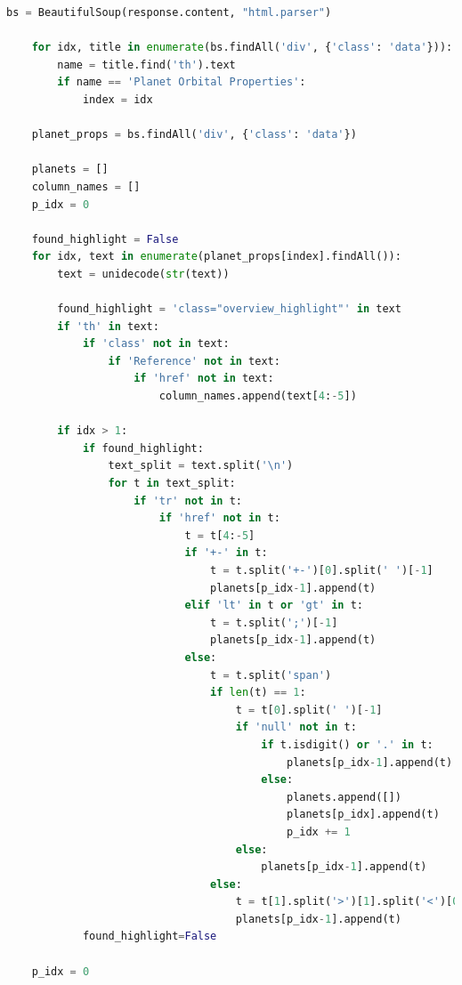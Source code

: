 \documentclass[11pt, oneside]{article}   	%
\begin{document}
\begin{lstlisting}[language=Python, caption={Extracting data from \href{https://exoplanetarchive.ipac.caltech.edu/}{Nasa Exoplanet Archive}}]
    bs = BeautifulSoup(response.content, "html.parser")

    for idx, title in enumerate(bs.findAll('div', {'class': 'data'})):
        name = title.find('th').text
        if name == 'Planet Orbital Properties':
            index = idx

    planet_props = bs.findAll('div', {'class': 'data'})

    planets = []
    column_names = []
    p_idx = 0

    found_highlight = False
    for idx, text in enumerate(planet_props[index].findAll()):
        text = unidecode(str(text))

        found_highlight = 'class="overview_highlight"' in text
        if 'th' in text:
            if 'class' not in text:
                if 'Reference' not in text:
                    if 'href' not in text:
                        column_names.append(text[4:-5])
                        
        if idx > 1:
            if found_highlight:
                text_split = text.split('\n')
                for t in text_split:
                    if 'tr' not in t:
                        if 'href' not in t:
                            t = t[4:-5]
                            if '+-' in t:
                                t = t.split('+-')[0].split(' ')[-1]
                                planets[p_idx-1].append(t)
                            elif 'lt' in t or 'gt' in t:
                                t = t.split(';')[-1]
                                planets[p_idx-1].append(t)
                            else:
                                t = t.split('span')
                                if len(t) == 1:
                                    t = t[0].split(' ')[-1]
                                    if 'null' not in t:
                                        if t.isdigit() or '.' in t:
                                            planets[p_idx-1].append(t)
                                        else:
                                            planets.append([])
                                            planets[p_idx].append(t)
                                            p_idx += 1
                                    else:
                                        planets[p_idx-1].append(t)
                                else:
                                    t = t[1].split('>')[1].split('<')[0]
                                    planets[p_idx-1].append(t)
            found_highlight=False

    p_idx = 0


\end{lstlisting}
\end{document}
